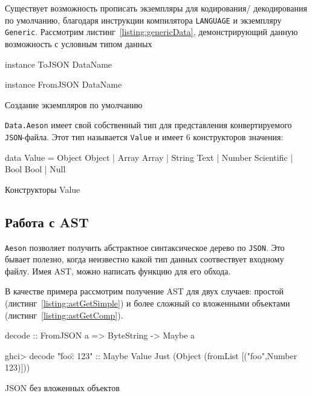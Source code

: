 Существует возможность прописать экземпляры для кодирования/ декодирования по умолчанию, благодаря инструкции компилятора \lstinline{LANGUAGE} и экземпляру \lstinline{Generic}. Рассмотрим листинг~\ref{listing:genericData}, демонстрирующий данную возможность с условным типом данных 

\begin{ListingEnv}[H]
\begin{Verb}
instance ToJSON DataName

instance FromJSON DataName
\end{Verb}
\caption{Создание экземпляров по умолчанию}
\label{listing:genericData}
\end{ListingEnv}

\lstinline{Data.Aeson} имеет свой собственный тип для представления конвертируемого \lstinline{JSON}-файла. Этот тип называется \lstinline{Value} и имеет 6 конструкторов значения:

\begin{ListingEnv}[H]
\begin{Verb}
data Value
  = Object Object
  | Array Array
  | String Text
  | Number Scientific
  | Bool Bool
  | Null
\end{Verb}
\caption{Конструкторы Value}
\label{listing:value}
\end{ListingEnv}

\subsection{Работа с AST}

\lstinline{Aeson} позволяет получить абстрактное синтаксическое дерево по \lstinline{JSON}. Это бывает полезно, когда неизвестно какой тип данных 
соотвествует входному файлу. Имея AST, можно написать функцию для его обхода.~\cite{aesonEx}

В качестве примера рассмотрим получение AST для двух случаев: простой (листинг~\ref{listing:astGetSimple}) и более сложный со вложенными объектами (листинг~\ref{listing:astGetComp}).

\begin{ListingEnv}[H]
\begin{Verb}
decode :: FromJSON a => ByteString -> Maybe a

ghci> decode "{\"foo\": 123}" :: Maybe Value
Just (Object (fromList [("foo",Number 123)]))
\end{Verb}
\caption{JSON без вложенных объектов}
\label{listing:astGetSimple}
\end{ListingEnv}

